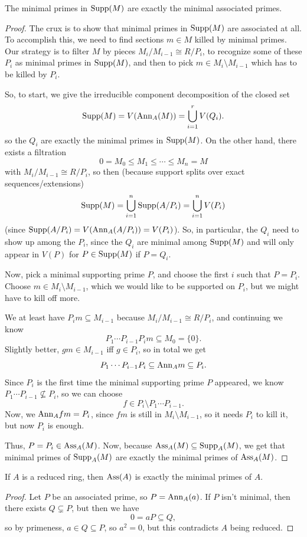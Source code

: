 \documentclass[12pt]{article}
\begin{document}
\begin{prop}
    The minimal primes in $\operatorname{Supp}(M)$ are exactly the minimal associated primes.
\end{prop}
\begin{proof}
    The crux is to show that minimal primes in $\operatorname{Supp}(M)$ are associated at all. To accomplish this, we need to find sections $m\in M$ killed by minimal primes. Our strategy is to filter $M$ by pieces $M_i/M_{i-1}\cong R/P_i$, to recognize some of these $P_i$ as minimal primes in $\operatorname{Supp}(M)$, and then to pick $m\in M_i\setminus M_{i-1}$ which has to be killed by $P_i$.
    
    So, to start, we give the irreducible component decomposition of the closed set
    \[\operatorname{Supp}(M) = V(\mathrm{Ann}_A(M)) = \bigcup_{i=1}^r V(Q_i).\]
    so the $Q_i$ are exactly the minimal primes in $\operatorname{Supp}(M)$. On the other hand, there exists a filtration
    \[0=M_0 \leq M_1 \leq \cdots \leq M_n = M\]
    with $M_i/M_{i-1}\cong R/P_i$, so then (because support splits over exact sequences/extensions)
    \[\operatorname{Supp}(M) = \bigcup_{i=1}^n \operatorname{Supp}(A/P_i) = \bigcup_{i=1}^n V(P_i)\]
    (since $\operatorname{Supp}(A/P_i) = V(\mathrm{Ann}_A(A/P_i)) = V(P_i)$). So, in particular, the $Q_i$ need to show up among the $P_i$, since the $Q_i$ are minimal among $\operatorname{Supp}(M)$ and will only appear in $V(P)$ for $P\in \operatorname{Supp}(M)$ if $P=Q_i$.

    Now, pick a minimal supporting prime $P$, and choose the first $i$ such that $P=P_i$. Choose $m\in M_i\setminus M_{i-1}$, which we would like to be supported on $P_i$, but we might have to kill off more.

    We at least have $P_i m \subseteq M_{i-1}$ because $M_i/M_{i-1}\cong R/P_i$, and continuing we know
    \[P_1\cdots P_{i-1} P_i m \subseteq M_0=\{0\}.\]
    Slightly better, $gm\in M_{i-1}$ iff $g\in P_i$, so in total we get
    \[P_1\cdots P_{i-1} P_i \subseteq \mathrm{Ann}_A m \subseteq P_i.\]
    Since $P_i$ is the first time the minimal supporting prime $P$ appeared, we know $P_1\cdots P_{i-1}\not\subseteq P_i$, so we can choose
    \[f \in P_i \setminus P_1\cdots P_{i-1}.\]
    Now, we $\mathrm{Ann}_A fm = P_i$, since $fm$ is still in $M_i\setminus M_{i-1}$, so it needs $P_i$ to kill it, but now $P_i$ is enough.

    Thus, $P=P_i \in \operatorname{Ass}_A(M)$. Now, because $\operatorname{Ass}_A(M)\subseteq \operatorname{Supp}_A(M)$, we get that minimal primes of $\operatorname{Supp}_A(M)$ are exactly the minimal primes of $\operatorname{Ass}_A(M)$.
\end{proof}

\begin{cor}
    If $A$ is a reduced ring, then $\operatorname{Ass}(A)$ is exactly the minimal primes of $A$.
\end{cor}
\begin{proof}
    Let $P$ be an associated prime, so $P=\mathrm{Ann}_A(a)$. If $P$ isn't minimal, then there exists $Q\subsetneq P$, but then we have
    \[0=aP \subseteq Q,\]
    so by primeness, $a\in Q\subseteq P$, so $a^2=0$, but this contradicts $A$ being reduced.
\end{proof}
\end{document}
